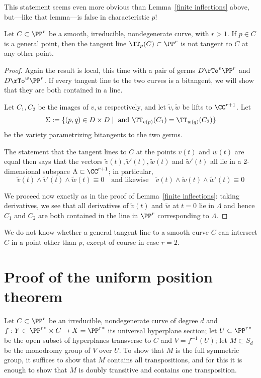  This statement seems even more obvious than Lemma~\ref{finite inflections} above, but---like that lemma---is false in characteristic $p$! 
 
 \begin{lemma}\label{tangent not bitangent}
 Let $C \subset \PP^r$ be a smooth, irreducible, nondegenerate curve, with $r > 1$. If $p \in C$ is a general point, then the tangent line $\TT_p(C) \subset \PP^r$ is not tangent to $C$ at any other point.
 \end{lemma}
 
 \begin{proof} Again the result is local, this time with a pair of germs $D\rTo^v \PP^r$ and $D\rTo^w \PP^r$. If every
 tangent line to the two curves is a bitangent, we will show that they are both contained in a line.
 
  Let $C_1, C_2$ be the images of $v,w$ respectively, and let $\tilde v, \tilde w$ be lifts to $\CC^{r+1}$.
 Let  
 $$
 \Sigma := \{ (p,q) \in D \times D \mid \text{ and }\TT_{v(p)}(C_1) = \TT_{w(q)}(C_2) \}
 $$
 be the variety parametrizing bitangents to the two germs. 
 
 
 
 The statement that the tangent lines to $C$ at the points $v(t)$ and $w(t)$ are equal then says that the vectors $\tilde v(t), \tilde v'(t),\tilde w(t)$ and $\tilde w'(t)$ all lie in a 2-dimensional subspace $\Lambda \subset \CC^{r+1}$; in particular,
 $$
 \tilde v(t) \wedge \tilde v'(t) \wedge \tilde w(t) \equiv 0 \quad \text{and likewise} \quad \tilde v(t) \wedge \tilde w(t) \wedge \tilde w'(t) \equiv 0
 $$
 
We proceed now exactly as in the proof of Lemma~\ref{finite inflections}: taking derivatives, we see that all derivatives of $\tilde v(t)$
and $\tilde w$ at $t=0$ lie in $\Lambda$
and hence $C_1$ and $C_2$ are both contained in the line in $\PP^r$ corresponding to $\Lambda$.
 \end{proof}

We do not know whether  a general tangent line to a smooth curve $C$ can intersect $C$ in a point other than $p$, except of course in case $r=2$. 

\section{Proof of the uniform position theorem}

Let $C \subset \PP^r$ be an irreducible, nondegenerate curve of degree $d$ and $f : Y \subset {\PP^r}^* \times C \to  X = {\PP^r}^*$ its universal hyperplane section; let $U \subset {\PP^r}^*$ be the open subset of hyperplanes transverse to $C$ and $V = f^{-1}(U)$; let $M \subset S_d$ be the monodromy group of $V$ over $U$.
To show that  $M$ is the full symmetric group, it suffices to show that $M$ contains all transpositions, and for this it is enough to show that $M$ is doubly transitive and contains one transposition.

